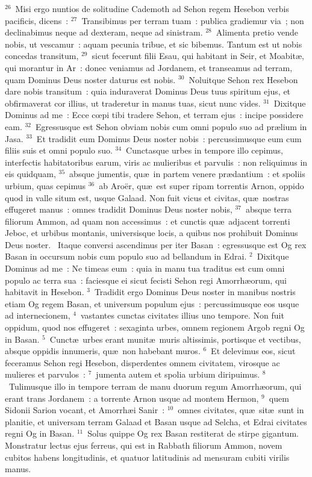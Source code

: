 ${}^{26}$~Misi ergo nuntios de solitudine Cademoth ad Sehon regem Hesebon verbis pacificis, dicens~:
${}^{27}$~Transibimus per terram tuam~: publica gradiemur via~; non declinabimus neque ad dexteram, neque ad sinistram.
${}^{28}$~Alimenta pretio vende nobis, ut vescamur~: aquam pecunia tribue, et sic bibemus. Tantum est ut nobis concedas transitum,
${}^{29}$~sicut fecerunt filii Esau, qui habitant in Seir, et Moabit\ae , qui morantur in Ar~: donec veniamus ad Jordanem, et transeamus ad terram, quam Dominus Deus noster daturus est nobis.
${}^{30}$~Noluitque Sehon rex Hesebon dare nobis transitum~: quia induraverat Dominus Deus tuus spiritum ejus, et obfirmaverat cor illius, ut traderetur in manus tuas, sicut nunc vides.
${}^{31}$~Dixitque Dominus ad me~: Ecce cœpi tibi tradere Sehon, et terram ejus~: incipe possidere eam.
${}^{32}$~Egressusque est Sehon obviam nobis cum omni populo suo ad pr\ae lium in Jasa.
${}^{33}$~Et tradidit eum Dominus Deus noster nobis~: percussimusque eum cum filiis suis et omni populo suo.
${}^{34}$~Cunctasque urbes in tempore illo cepimus, interfectis habitatoribus earum, viris ac mulieribus et parvulis~: non reliquimus in eis quidquam,
${}^{35}$~absque jumentis, qu\ae\ in partem venere pr\ae dantium~: et spoliis urbium, quas cepimus
${}^{36}$~ab Aro\"er, qu\ae\ est super ripam torrentis Arnon, oppido quod in valle situm est, usque Galaad. Non fuit vicus et civitas, qu\ae\ nostras effugeret manus~: omnes tradidit Dominus Deus noster nobis,
${}^{37}$~absque terra filiorum Ammon, ad quam non accessimus~: et cunctis qu\ae\ adjacent torrenti Jeboc, et urbibus montanis, universisque locis, a quibus nos prohibuit Dominus Deus noster.
~\lettrine[lines=10,image=true,loversize=0.05,lraise=-0.03]{I}{}taque conversi ascendimus per iter Basan~: egressusque est Og rex Basan in occursum nobis cum populo suo ad bellandum in Edrai.
${}^{2}$~Dixitque Dominus ad me~: Ne timeas eum~: quia in manu tua traditus est cum omni populo ac terra sua~: faciesque ei sicut fecisti Sehon regi Amorrh\ae orum, qui habitavit in Hesebon.
${}^{3}$~Tradidit ergo Dominus Deus noster in manibus nostris etiam Og regem Basan, et universum populum ejus~: percussimusque eos usque ad internecionem,
${}^{4}$~vastantes cunctas civitates illius uno tempore. Non fuit oppidum, quod nos effugeret~: sexaginta urbes, omnem regionem Argob regni Og in Basan.
${}^{5}$~Cunct\ae\ urbes erant munit\ae\ muris altissimis, portisque et vectibus, absque oppidis innumeris, qu\ae\ non habebant muros.
${}^{6}$~Et delevimus eos, sicut feceramus Sehon regi Hesebon, disperdentes omnem civitatem, virosque ac mulieres et parvulos~:
${}^{7}$~jumenta autem et spolia urbium diripuimus.
${}^{8}$~Tulimusque illo in tempore terram de manu duorum regum Amorrh\ae orum, qui erant trans Jordanem~: a torrente Arnon usque ad montem Hermon,
${}^{9}$~quem Sidonii Sarion vocant, et Amorrh\ae i Sanir~:
${}^{10}$~omnes civitates, qu\ae\ sit\ae\ sunt in planitie, et universam terram Galaad et Basan usque ad Selcha, et Edrai civitates regni Og in Basan.
${}^{11}$~Solus quippe Og rex Basan restiterat de stirpe gigantum. Monstratur lectus ejus ferreus, qui est in Rabbath filiorum Ammon, novem cubitos habens longitudinis, et quatuor latitudinis ad mensuram cubiti virilis manus.



